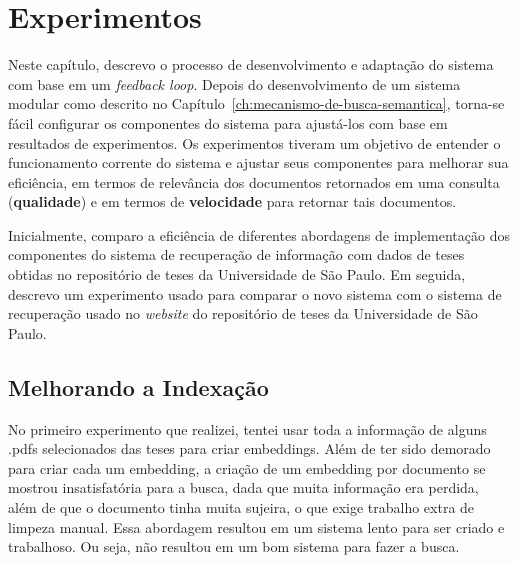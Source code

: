 \documentclass[
	12pt,				%
	openright,			%
	oneside,			%
	a4paper,			%
	english,			%
	french,				%
	spanish,			%
	brazil				%
	]{abntex2}
\begin{document}
\chapter{Experimentos}
\label{ch:exper}

Neste capítulo, descrevo o processo de desenvolvimento e adaptação do sistema com base em um \textit{feedback loop}.
Depois do desenvolvimento de um sistema modular como descrito no Capítulo~\ref{ch:mecanismo-de-busca-semantica}, torna-se
fácil configurar os componentes do sistema para ajustá-los com base em resultados de experimentos.
Os experimentos tiveram um objetivo de entender o funcionamento corrente do sistema e ajustar seus componentes
para melhorar sua eficiência, em termos de relevância dos documentos retornados em uma consulta (\textbf{qualidade})
e em termos de \textbf{velocidade} para retornar tais documentos.

Inicialmente, comparo a eficiência de diferentes abordagens de implementação dos componentes do sistema de recuperação
de informação com dados de teses obtidas no repositório de teses da Universidade de São Paulo.
Em seguida, descrevo um experimento usado para comparar o novo sistema com o sistema de recuperação usado no \textit{website}
do repositório de teses da Universidade de São Paulo.

\section{Melhorando a Indexação}
No primeiro experimento que realizei, tentei usar toda a informação de alguns .pdfs selecionados das teses para criar
embeddings.
Além de ter sido demorado para criar cada um embedding, a criação de um embedding por documento se mostrou insatisfatória
para a busca, dada que muita informação era perdida, além de que o documento tinha muita sujeira, o que exige trabalho
extra de limpeza manual.
Essa abordagem resultou em um sistema lento para ser criado e trabalhoso.
Ou seja, não resultou em um bom sistema para fazer a busca.
\end{document}
